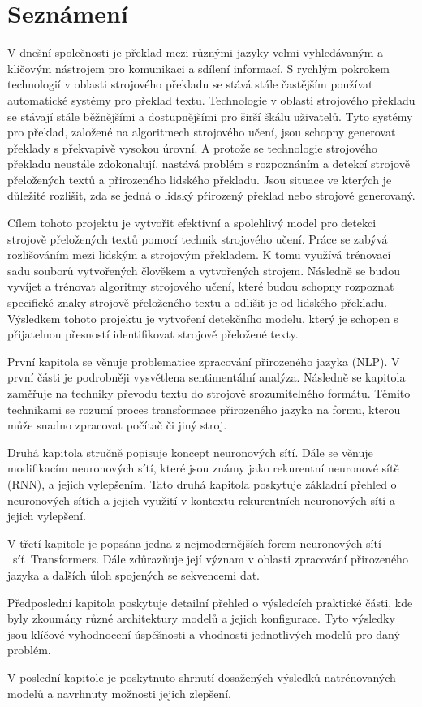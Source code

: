 \chapter{Seznámení}\label{sec:Introduction}
V dnešní společnosti je překlad mezi různými jazyky velmi vyhledávaným a klíčovým nástrojem pro komunikaci a sdílení informací.
S rychlým pokrokem technologií v oblasti strojového překladu se stává stále častějším používat automatické systémy pro překlad textu.
Technologie v oblasti strojového překladu se stávají stále běžnějšími a dostupnějšími pro širší škálu uživatelů.
Tyto systémy pro překlad, založené na algoritmech strojového učení, jsou schopny generovat překlady s překvapivě vysokou úrovní.
A protože se technologie strojového překladu neustále zdokonalují, nastává problém s rozpoznáním a detekcí strojově přeložených textů a přirozeného lidského překladu.
Jsou situace ve kterých je důležité rozlišit, zda se jedná o lidský přirozený překlad nebo strojově generovaný.

Cílem tohoto projektu je vytvořit efektivní a spolehlivý model pro detekci strojově přeložených textů pomocí technik strojového učení.
Práce se zabývá rozlišováním mezi lidským a strojovým překladem.
K tomu využívá trénovací sadu souborů vytvořených člověkem a vytvořených strojem.
Následně se budou vyvíjet a trénovat algoritmy strojového učení, které budou schopny rozpoznat specifické znaky strojově přeloženého textu a odlišit je od lidského překladu.
Výsledkem tohoto projektu je vytvoření detekčního modelu, který je schopen s přijatelnou přesností identifikovat strojově přeložené texty.

První kapitola se věnuje problematice zpracování přirozeného jazyka (NLP).
V první části je podrobněji vysvětlena sentimentální analýza.
Následně se kapitola zaměřuje na techniky převodu textu do strojově srozumitelného formátu.
Těmito technikami se rozumí proces transformace přirozeného jazyka na formu, kterou může snadno zpracovat počítač či jiný stroj.

Druhá kapitola stručně popisuje koncept neuronových sítí. Dále se věnuje modifikacím neuronových sítí, které jsou známy jako rekurentní neuronové sítě (RNN), a jejich vylepšením.
Tato druhá kapitola poskytuje základní přehled o neuronových sítích a jejich využití v kontextu rekurentních neuronových sítí a jejich vylepšení.

V třetí kapitole je popsána jedna z nejmodernějších forem neuronových sítí -~síť~Transformers.
Dále zdůrazňuje její význam v oblasti zpracování přirozeného jazyka a dalších úloh spojených se sekvencemi dat.

Předposlední kapitola poskytuje detailní přehled o výsledcích praktické části, kde byly zkoumány různé architektury modelů a jejich konfigurace. Tyto výsledky jsou klíčové vyhodnocení úspěšnosti a vhodnosti jednotlivých modelů pro daný problém.

V poslední kapitole je poskytnuto shrnutí dosažených výsledků natrénovaných modelů a navrhnuty možnosti jejich zlepšení.

\endinput